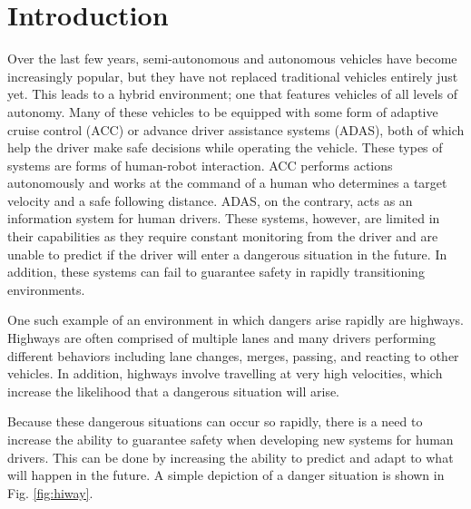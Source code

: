 \documentclass[conference]{IEEEtran}
\begin{document}
\begin{abstract}
\end{abstract}





%
\IEEEpeerreviewmaketitle



\section{Introduction}
    Over the last few years, semi-autonomous and autonomous vehicles have become increasingly popular, but they have not replaced traditional vehicles entirely just yet. This leads to a hybrid environment; one that features vehicles of all levels of autonomy. Many of these vehicles to be equipped with some form of adaptive cruise control (ACC) or advance driver assistance systems (ADAS), both of which help the driver make safe decisions while operating the vehicle. These types of systems are forms of human-robot interaction. ACC performs actions autonomously and works at the command of a human who determines a target velocity and a safe following distance. ADAS, on the contrary, acts as an information system for human drivers. These systems, however, are limited in their capabilities as they require constant monitoring from the driver and are unable to predict if the driver will enter a dangerous situation in the future. In addition, these systems can fail to guarantee safety in rapidly transitioning environments.
    
    One such example of an environment in which dangers arise rapidly are highways. Highways are often comprised of multiple lanes and many drivers performing different behaviors including lane changes, merges, passing, and reacting to other vehicles. In addition, highways involve travelling at very high velocities, which increase the likelihood that a dangerous situation will arise.
    
    Because these dangerous situations can occur so rapidly, there is a need to increase the ability to guarantee safety when developing new systems for human drivers. This can be done by increasing the ability to predict and adapt to what will happen in the future. A simple depiction of a danger situation is shown in Fig. \ref{fig:hiway}. 
\end{document}
